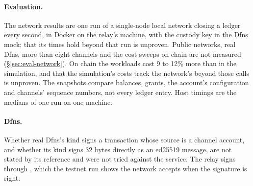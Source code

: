 \paragraph{Evaluation.} The network results are one run of a single-node
local network closing a ledger every second, in Docker on the relay's machine,
with the custody key in the Dfns mock; that its times hold beyond that run is
unproven. Public networks, real Dfns, more than
eight channels and the cost sweeps on chain are not measured
(\S\ref{sec:eval-network}). On chain the workloads cost 9 to 12\% more than in
the simulation, and that the simulation's costs track the network's beyond
those calls is unproven. The snapshots compare
balances, grants, the account's configuration and channels' sequence numbers,
not every ledger entry. Host timings are the medians
of one run on one machine.

\paragraph{Dfns.} Whether real Dfns's  kind signs a
transaction whose source is a channel account,
and whether its  kind signs 32 bytes directly as an ed25519
message, are not stated by its reference and were not tried
against the service. The relay signs through , which the testnet
run shows the network accepts when the signature is right.
